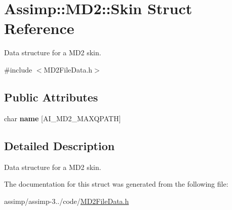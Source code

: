 \hypertarget{struct_assimp_1_1_m_d2_1_1_skin}{\section{Assimp\+:\+:M\+D2\+:\+:Skin Struct Reference}
\label{struct_assimp_1_1_m_d2_1_1_skin}
}


Data structure for a M\+D2 skin.  




{\ttfamily \#include $<$M\+D2\+File\+Data.\+h$>$}

\subsection*{Public Attributes}
\begin{DoxyCompactItemize}
\item 
\hypertarget{struct_assimp_1_1_m_d2_1_1_skin_ae7fb2c0ecaafa4501cc5599bfe78f13a}{char {\bfseries name} \mbox{[}A\+I\+\_\+\+M\+D2\+\_\+\+M\+A\+X\+Q\+P\+A\+T\+H\mbox{]}}\label{struct_assimp_1_1_m_d2_1_1_skin_ae7fb2c0ecaafa4501cc5599bfe78f13a}

\end{DoxyCompactItemize}


\subsection{Detailed Description}
Data structure for a M\+D2 skin. 

The documentation for this struct was generated from the following file\+:\begin{DoxyCompactItemize}
\item 
assimp/assimp-\/3../code/\hyperlink{_m_d2_file_data_8h}{M\+D2\+File\+Data.\+h}\end{DoxyCompactItemize}
